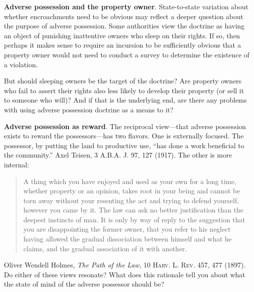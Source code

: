 \item \textbf{Adverse possession and the property owner}.
State-to-state variation about whether encroachments need to be obvious may
reflect a deeper question about the purpose of adverse possession. Some
authorities view the doctrine as having an object of punishing inattentive
owners who sleep on their rights. If so, then perhaps it makes sense to require
an incursion to be sufficiently obvious that a property owner would not need to
conduct a survey to determine the existence of a violation. 

But should sleeping owners be the target of the doctrine? Are property owners
who fail to assert their rights also less likely to develop their property (or
sell it to someone who will)? And if that is the underlying end, are there any
problems with using adverse possession doctrine as a means to it?

\item \textbf{Adverse possession as reward}. The reciprocal view---that
adverse possession exists to reward the possessors---has two flavors. One is
externally focused. The possessor, by putting the land to productive use, ``has
done a work beneficial to the community.'' Axel Teisen, 3 A.B.A. J. 97, 127
(1917). The other is more internal:
\begin{quote}
A thing which you have enjoyed and used as your own for a long time, whether
property or an opinion, takes root in your being and cannot be torn away
without your resenting the act and trying to defend yourself, however you came
by it. The law can ask no better justification than the deepest instincts of
man. It is only by way of reply to the suggestion that you are disappointing
the former owner, that you refer to his neglect having allowed the gradual
dissociation between himself and what he claims, and the gradual association of
it with another.
\end{quote}
Oliver Wendell Holmes,\textit{ The Path of the Law,} 10 \textsc{Harv. L. Rev.}
457, 477 (1897). Do either of these views resonate? What does this rationale
tell you about what the state of mind of the adverse possessor should be? 


